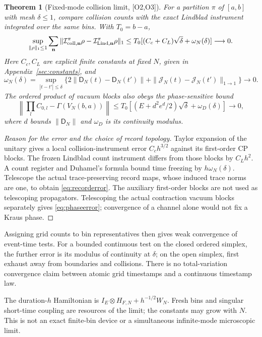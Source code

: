 \documentclass[11pt,letterpaper]{article}
\numberwithin{equation}{section}
\newtheorem{theorem}{Theorem}[section]
\theoremstyle{remark}
\newcommand{\ev}[1]{\textsf{[#1]}}
\begin{document}
\begin{theorem}[Fixed-mode collision limit, \ev{O2,O3}]
For a partition $\pi$ of $[a,b]$ with mesh $\delta\le1$, compare
collision counts with the exact Lindblad instrument integrated over
the \emph{same bins}. With $T_0=b-a$,
\begin{equation}
 \sup_{\|\rho\|_1\le1}\sum_{\mathbf n}
 \|\mathcal I^\pi_{{\rm coll},\mathbf n}\rho-
   \mathcal I^\pi_{{\rm Lind},\mathbf n}\rho\|_1
 \le T_0[(C_c+C_L)\sqrt\delta+\omega_N(\delta)]\longrightarrow0.
 \label{eq:recorderror}
\end{equation}
Here $C_c,C_L$ are explicit finite constants at fixed $N$, given in
Appendix~\ref{sec:constants}, and
\[
 \omega_N(\delta)=\sup_{|t-t'|\le\delta}
 \{2\|\mathsf D_N(t)-\mathsf D_N(t')\|
       +\|\mathcal J_N(t)-\mathcal J_N(t')\|_{1\to1}\}\to0.
\]
The ordered product of vacuum blocks also obeys the phase-sensitive bound
\begin{equation}
 \left\|\prod_l C_{0,l}-\Gamma(V_N(b,a))\right\|
 \le T_0[(E+d^2e^d/2)\sqrt\delta+\omega_D(\delta)]\to0,
 \label{eq:phaseerror}
\end{equation}
where $d$ bounds $\|\mathsf D_N\|$ and $\omega_D$ is its continuity modulus.
\end{theorem}
\begin{proof}[Reason for the error and the choice of record topology]
Taylor expansion of the unitary gives a local collision-instrument
error $C_ch^{3/2}$ against its first-order CP blocks. The frozen
Lindblad count instrument differs from those blocks by $C_Lh^2$.
A count register and Duhamel's formula bound time freezing by
$h\omega_N(\delta)$. Telescope the actual trace-preserving record
maps, whose induced trace norms are one, to obtain
\eqref{eq:recorderror}. The auxiliary first-order blocks are not used
as telescoping propagators. Telescoping the actual contraction
vacuum blocks separately gives \eqref{eq:phaseerror}; convergence of
a channel alone would not fix a Kraus phase.
\end{proof}

Assigning grid counts to bin representatives then gives weak
convergence of event-time tests. For a bounded continuous test on the
closed ordered simplex, the further error is its modulus of continuity
at $\delta$; on the open simplex, first exhaust away from boundaries
and collisions. There is no total-variation convergence claim between
atomic grid timestamps and a continuous timestamp law.

The duration-$h$ Hamiltonian is
$I_E\otimes H_{F,N}+h^{-1/2}W_N$. Fresh bins and singular short-time
coupling are resources of the limit; the constants may grow with $N$.
This is not an exact finite-bin device or a simultaneous infinite-mode
microscopic limit.
\end{document}
